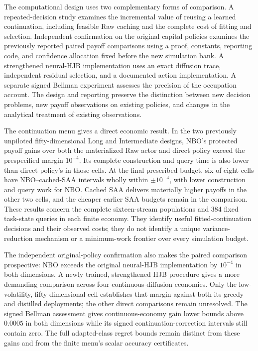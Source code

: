 The computational design uses two complementary forms of comparison. A repeated-decision study examines the incremental value of reusing a learned continuation, including feasible Raw caching and the complete cost of fitting and selection. Independent confirmation on the original capital policies examines the previously reported paired payoff comparisons using a proof, constants, reporting code, and confidence allocation fixed before the new simulation bank. A strengthened neural-HJB implementation uses an exact diffusion trace, independent residual selection, and a documented action implementation. A separate signed Bellman experiment assesses the precision of the occupation account. The design and reporting preserve the distinction between new decision problems, new payoff observations on existing policies, and changes in the analytical treatment of existing observations.

The continuation menu gives a direct economic result. In the two previously unpiloted fifty-dimensional Long and Intermediate designs, NBO's protected payoff gains over both the materialized Raw actor and direct policy exceed the prespecified margin $10^{-4}$. Its complete construction and query time is also lower than direct policy's in those cells. At the final prescribed budget, six of eight cells have NBO--cached-SAA intervals wholly within $\pm10^{-4}$, with lower construction and query work for NBO. Cached SAA delivers materially higher payoffs in the other two cells, and the cheaper earlier SAA budgets remain in the comparison. These results concern the complete sixteen-stream populations and 384 fixed task-state queries in each finite economy. They identify useful fitted-continuation decisions and their observed costs; they do not identify a unique variance-reduction mechanism or a minimum-work frontier over every simulation budget.

The independent original-policy confirmation also makes the paired comparison prospective: NBO exceeds the original neural-HJB implementation by $10^{-4}$ in both dimensions. A newly trained, strengthened HJB procedure gives a more demanding comparison across four continuous-diffusion economies. Only the low-volatility, fifty-dimensional cell establishes that margin against both its greedy and distilled deployments; the other direct comparisons remain unresolved. The signed Bellman assessment gives continuous-economy gain lower bounds above $0.0005$ in both dimensions while its signed continuation-correction intervals still contain zero. The full adapted-class regret bounds remain distinct from these gains and from the finite menu's scalar accuracy certificates.

